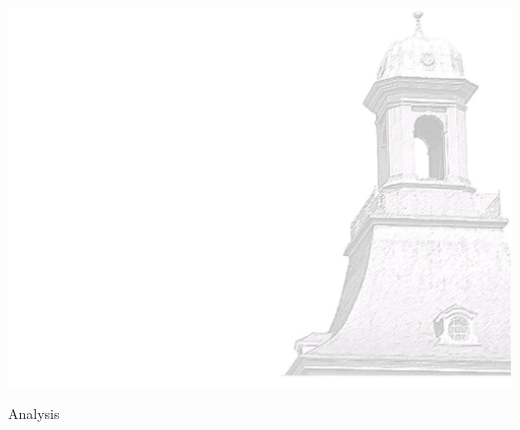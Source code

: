 \documentclass[xcolor=dvipsnames]{beamer}
\begin{document}
    
    {\usebackgroundtemplate%
        {%
            \includegraphics[width=\paperwidth,height=\paperheight]{bkg1.pdf}%
        }
        \begin{frame}
            \centering \Huge \color{ublue} Analysis
            \thispagestyle{empty}
            \addtocounter{framenumber}{-1}
        \end{frame}
    }
    
\end{document}
